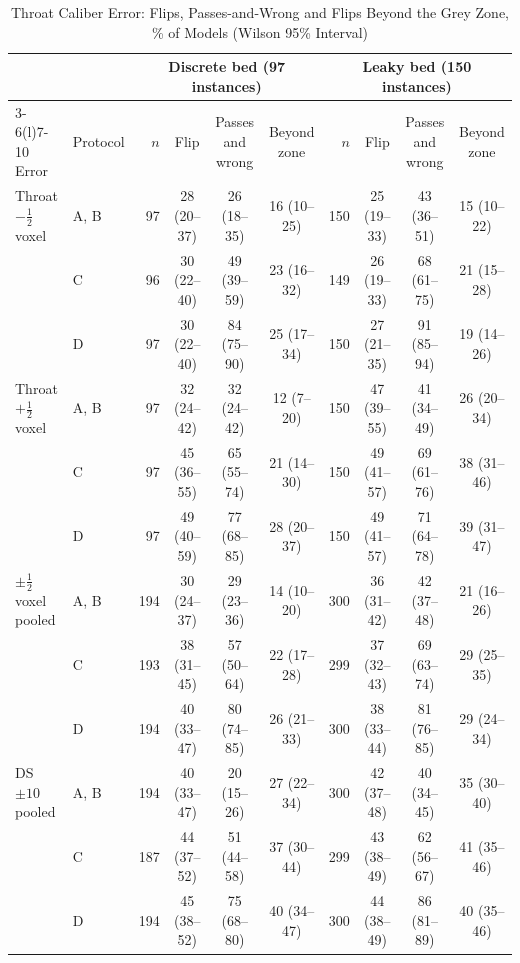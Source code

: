 \documentclass[journal,twoside,web,onecolumn]{ieeecolor}
\begin{document}
\begin{table}[!ht]
\caption{Throat Caliber Error: Flips, Passes-and-Wrong and Flips Beyond the Grey Zone, \% of Models (Wilson 95\% Interval)}\label{tab:throat}
\centering\footnotesize\setlength{\tabcolsep}{3pt}
\begin{tabular}{@{}llrccc rccc@{}}
\toprule
 & & \multicolumn{4}{c}{Discrete bed (97 instances)} & \multicolumn{4}{c}{Leaky bed (150 instances)}\\
\cmidrule(lr){3-6}\cmidrule(l){7-10}
Error & Protocol & $n$ & Flip & Passes and wrong & Beyond zone & $n$ & Flip & Passes and wrong & Beyond zone\\
\midrule
Throat $-\tfrac12$ voxel & A, B & 97 & 28 (20--37) & 26 (18--35) & 16 (10--25) & 150 & 25 (19--33) & 43 (36--51) & 15 (10--22) \\
 & C & 96 & 30 (22--40) & 49 (39--59) & 23 (16--32) & 149 & 26 (19--33) & 68 (61--75) & 21 (15--28) \\
 & D & 97 & 30 (22--40) & 84 (75--90) & 25 (17--34) & 150 & 27 (21--35) & 91 (85--94) & 19 (14--26) \\
\addlinespace[2pt]
Throat $+\tfrac12$ voxel & A, B & 97 & 32 (24--42) & 32 (24--42) & 12 (7--20) & 150 & 47 (39--55) & 41 (34--49) & 26 (20--34) \\
 & C & 97 & 45 (36--55) & 65 (55--74) & 21 (14--30) & 150 & 49 (41--57) & 69 (61--76) & 38 (31--46) \\
 & D & 97 & 49 (40--59) & 77 (68--85) & 28 (20--37) & 150 & 49 (41--57) & 71 (64--78) & 39 (31--47) \\
\addlinespace[2pt]
$\pm\tfrac12$ voxel pooled & A, B & 194 & 30 (24--37) & 29 (23--36) & 14 (10--20) & 300 & 36 (31--42) & 42 (37--48) & 21 (16--26) \\
 & C & 193 & 38 (31--45) & 57 (50--64) & 22 (17--28) & 299 & 37 (32--43) & 69 (63--74) & 29 (25--35) \\
 & D & 194 & 40 (33--47) & 80 (74--85) & 26 (21--33) & 300 & 38 (33--44) & 81 (76--85) & 29 (24--34) \\
\addlinespace[2pt]
DS $\pm10$ pooled & A, B & 194 & 40 (33--47) & 20 (15--26) & 27 (22--34) & 300 & 42 (37--48) & 40 (34--45) & 35 (30--40) \\
 & C & 187 & 44 (37--52) & 51 (44--58) & 37 (30--44) & 299 & 43 (38--49) & 62 (56--67) & 41 (35--46) \\
 & D & 194 & 45 (38--52) & 75 (68--80) & 40 (34--47) & 300 & 44 (38--49) & 86 (81--89) & 40 (35--46) \\
\bottomrule
\end{tabular}

\end{table}
\end{document}
